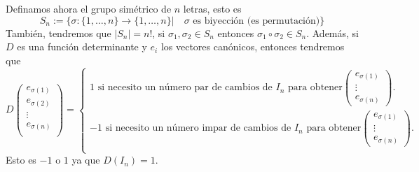 \documentclass[12pt,a4paper]{book}
\newcommand{\llaves}[1]{\{#1\}}
\begin{document}
    \begin{definicion}
    \label{def:35}
        Definamos ahora el grupo simétrico de $n$ letras, esto es
        \begin{equation*}
        S_{n} := \llaves{\sigma: \llaves{1, \dots, n} \to \llaves{1, \dots, n} | \quad \sigma \text{ es biyección (es permutación)}}
        \end{equation*}
        También, tendremos que $|S_{n}| = n!$, si $\sigma_{1}, \sigma_{2} \in S_{n}$ entonces $\sigma_{1} \circ \sigma_{2} \in S_{n}$. Además, si $D$ es una función determinante y $e_{i}$ los vectores canónicos, entonces tendremos que
        \begin{equation*}
        D \begin{pmatrix}
            e_{\sigma(1)}\\
            e_{\sigma(2)}\\
            \vdots\\
            e_{\sigma(n)}\\
        \end{pmatrix} = \begin{cases}
            1 \text{ si necesito un número par de cambios de $I_{n}$ para obtener} \begin{pmatrix}
                e_{\sigma(1)}\\
                \vdots\\
                e_{\sigma(n)}
            \end{pmatrix}.\\
            - 1 \text{ si necesito un número impar de cambios de $I_{n}$ para obtener} \begin{pmatrix}
                e_{\sigma(1)}\\
                \vdots\\
                e_{\sigma(n)}
            \end{pmatrix}.\\
        \end{cases}
        \end{equation*}
        Esto es $-1$ o $1$ ya que $D(I_{n}) = 1$.
    \end{definicion}
\end{document}
